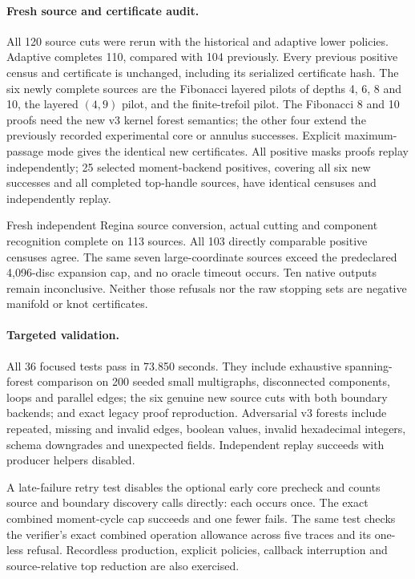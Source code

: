 \paragraph{Fresh source and certificate audit.}
All 120 source cuts were rerun with the historical and adaptive lower
policies. Adaptive completes 110, compared with 104 previously. Every
previous positive census and certificate is unchanged, including its
serialized certificate hash. The six newly complete sources are the
Fibonacci layered pilots of depths 4, 6, 8 and 10, the layered $(4,9)$
pilot, and the finite-trefoil pilot. The Fibonacci 8 and 10 proofs need the
new v3 kernel forest semantics; the other four extend the previously
recorded experimental core or annulus successes. Explicit maximum-passage
mode gives the identical new certificates. All positive masks proofs
replay independently; 25 selected moment-backend positives, covering all
six new successes and all completed top-handle sources, have identical
censuses and independently replay.

Fresh independent Regina source conversion, actual cutting and component
recognition complete on 113 sources. All 103 directly comparable positive
censuses agree. The same seven large-coordinate sources exceed the
predeclared 4,096-disc expansion cap, and no oracle timeout occurs. Ten
native outputs remain inconclusive. Neither those refusals nor the raw
stopping sets are negative manifold or knot certificates.

\paragraph{Targeted validation.}
All 36 focused tests pass in 73.850 seconds. They include exhaustive
spanning-forest comparison on 200 seeded small multigraphs, disconnected
components, loops and parallel edges; the six genuine new source cuts with
both boundary backends; and exact legacy proof reproduction. Adversarial
v3 forests include repeated, missing and invalid edges, boolean values,
invalid hexadecimal integers, schema downgrades and unexpected fields.
Independent replay succeeds with producer helpers disabled.

A late-failure retry test disables the optional early core precheck and
counts source and boundary discovery calls directly: each occurs once.
The exact combined moment-cycle cap succeeds and one fewer fails. The
same test checks the verifier's exact combined operation allowance across five traces and its
one-less refusal. Recordless production, explicit policies, callback
interruption and source-relative top reduction are also exercised.

